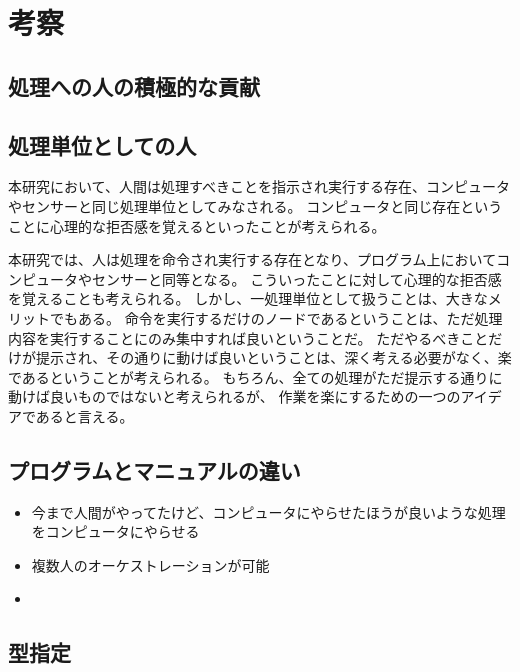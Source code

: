 \chapter{考察}\label{chap:discussion}

\section{処理への人の積極的な貢献}\label{ux51e6ux7406ux3078ux306eux4ebaux306eux7a4dux6975ux7684ux306aux8ca2ux732e}

\section{処理単位としての人}\label{ux51e6ux7406ux5358ux4f4dux3068ux3057ux3066ux306eux4eba}

本研究において、人間は処理すべきことを指示され実行する存在、コンピュータやセンサーと同じ処理単位としてみなされる。
コンピュータと同じ存在ということに心理的な拒否感を覚えるといったことが考えられる。

本研究では、人は処理を命令され実行する存在となり、プログラム上においてコンピュータやセンサーと同等となる。
こういったことに対して心理的な拒否感を覚えることも考えられる。
しかし、一処理単位として扱うことは、大きなメリットでもある。
命令を実行するだけのノードであるということは、ただ処理内容を実行することにのみ集中すれば良いということだ。
ただやるべきことだけが提示され、その通りに動けば良いということは、深く考える必要がなく、楽であるということが考えられる。
もちろん、全ての処理がただ提示する通りに動けば良いものではないと考えられるが、
作業を楽にするための一つのアイデアであると言える。

\section{プログラムとマニュアルの違い}\label{ux30d7ux30edux30b0ux30e9ux30e0ux3068ux30deux30cbux30e5ux30a2ux30ebux306eux9055ux3044}

\begin{itemize}
\item
  今まで人間がやってたけど、コンピュータにやらせたほうが良いような処理をコンピュータにやらせる
\item
  複数人のオーケストレーションが可能
\item
\end{itemize}

\section{型指定}\label{ux578bux6307ux5b9a}

